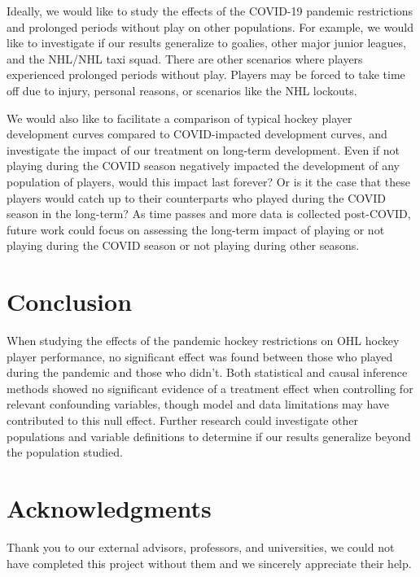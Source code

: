 \documentclass[12pt]{article}
\begin{document}
Ideally, we would like to study the effects of the COVID-19 pandemic
restrictions and prolonged periods without play on other populations.
For example, we would like to investigate if our results generalize to
goalies, other major junior leagues, and the NHL/NHL taxi squad. There
are other scenarios where players experienced prolonged periods without
play. Players may be forced to take time off due to injury, personal
reasons, or scenarios like the NHL lockouts.

We would also like to facilitate a comparison of typical hockey player
development curves compared to COVID-impacted development curves, and
investigate the impact of our treatment on long-term development. Even
if not playing during the COVID season negatively impacted the
development of any population of players, would this impact last
forever? Or is it the case that these players would catch up to their
counterparts who played during the COVID season in the long-term? As
time passes and more data is collected post-COVID, future work could
focus on assessing the long-term impact of playing or not playing during
the COVID season or not playing during other seasons.

\hypertarget{conclusion}{%
\section{Conclusion}\label{conclusion}}

When studying the effects of the pandemic hockey restrictions on OHL
hockey player performance, no significant effect was found between those
who played during the pandemic and those who didn't. Both statistical
and causal inference methods showed no significant evidence of a
treatment effect when controlling for relevant confounding variables,
though model and data limitations may have contributed to this null
effect. Further research could investigate other populations and
variable definitions to determine if our results generalize beyond the
population studied.

\hypertarget{acknowledgments}{%
\section{Acknowledgments}\label{acknowledgments}}

Thank you to our external advisors, professors, and universities, we
could not have completed this project without them and we sincerely
appreciate their help.

\pagebreak



\end{document}
